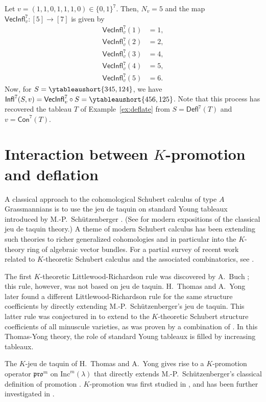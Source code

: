 \documentclass[12pt]{amsart}
\theoremstyle{definition}
\newenvironment{example}
  {\pushQED{\qed}\renewcommand{\qedsymbol}{$\diamondsuit$}\examplex}
  {\popQED\endexamplex}
\theoremstyle{remark}
\numberwithin{equation}{section}
\newcommand{\inc}{\ensuremath{\mathrm{Inc}}}
\newcommand{\pro}{\mathfrak{pro}}
\newcommand{\deflate}{\ensuremath{\mathsf{Defl}}}
\newcommand{\inflate}{\ensuremath{\mathsf{VecInfl}}}
\newcommand{\tinflate}{\ensuremath{\mathsf{Infl}}}
\newcommand{\content}{\ensuremath{\mathsf{Con}}}
\begin{document}
\begin{example}\label{ex:reinflate}
Let $v = (1,1,0,1,1,1,0) \in \{0,1\}^7$. Then, $N_v = 5$ and the map $\inflate^7_v : [5] \to [7]$ is given by 
\begin{align*}
\inflate^7_v(1) &= 1, \\
\inflate^7_v(2) &= 2, \\
\inflate_v^7(3) &= 4, \\
\inflate_v^7(4) &= 5, \\
\inflate_v^7(5) &= 6. 
\end{align*}
Now, for $S = \ytableaushort{345,124}$, we have $\tinflate^7(S,v) = \inflate^7_v \circ S = \ytableaushort{456,125}$. Note that this process has recovered the tableau $T$ of Example~\ref{ex:deflate} from $S=\deflate^7(T)$ and $v=\content^7(T)$.
\end{example}

\section{Interaction between $K$-promotion and deflation}\label{sec:interaction}
A classical approach to the cohomological Schubert calculus of type $A$ Grassmannians is to use the jeu de taquin on standard Young tableaux introduced by M.-P.~Sch\"utzenberger \cite{Schutzenberger:jdt}. (See \cite{Fulton, Manivel} for modern expositions of the classical jeu de taquin theory.) A theme of modern Schubert calculus has been extending such theories to richer generalized cohomologies and in particular into the $K$-theory ring of algebraic vector bundles. For a partial survey of recent work related to $K$-theoretic Schubert calculus and the associated combinatorics, see \cite{Pechenik.Yong:genomic}.

The first $K$-theoretic Littlewood-Richardson rule was discovered by A.~Buch \cite{Buch}; this rule, however, was not based on jeu de taquin. H.~Thomas and A.~Yong \cite{Thomas.Yong:K} later found a different Littlewood-Richardson rule for the same structure coefficients by directly extending M.-P.~Sch\"utzenberger's jeu de taquin. This latter rule was conjectured in \cite{Thomas.Yong:K} to extend to the $K$-theoretic Schubert structure coefficients of all minuscule varieties, as was proven by a combination of \cite{Buch.Ravikumar,Clifford.Thomas.Yong,Buch.Samuel}. In this Thomas-Yong theory, the role of standard Young tableaux is filled by increasing tableaux.

The $K$-jeu de taquin of H.~Thomas and A.~Yong \cite{Thomas.Yong:K} gives rise to a $K$-promotion operator $\pro^m$ on $\inc^m(\lambda)$ that directly extends M.-P.~Sch\"utzenberger's classical definition of promotion \cite{Schutzenberger:promotion}. $K$-promotion was first studied in \cite{Pechenik}, and has been further investigated in \cite{BPS, Pressey.Stokke.Visentin, Rhoades:skein, DPS, Pechenik:frames,Vorland}. 
\end{document}
